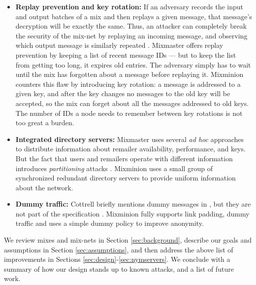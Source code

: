 \documentclass[final,inpress,inline]{ieee}
\begin{document}
\begin{itemize}
\item \textbf{Replay prevention and key rotation:} 
If an adversary records the input and output batches of a mix and then
replays a given message, that message's decryption will be exactly the
same. Thus, an attacker can completely break the security of the mix-net by
replaying an incoming message, and observing which output message is 
similarly repeated
\cite{chaum-mix}. Mixmaster offers replay prevention by
keeping a list of recent message IDs --- but to keep the list from
getting too long, it expires old entries. The adversary simply has to
wait until the mix has forgotten about a
message before replaying it. Mixminion counters this flaw by introducing
key rotation: a message is addressed to a given key, and after the key
changes no messages to the old key will be accepted, so the mix can forget
about all the messages addressed to old keys. The
number of IDs a node needs to remember between key rotations is not
too great a burden.

\item \textbf{Integrated directory servers:} Mixmaster uses several \emph{ad hoc}
approaches to distribute information about remailer availability, performance, and
keys. But the fact that users and remailers operate with
different information introduces \emph{partitioning} attacks
\cite{XXXX}.  Mixminion
uses a small group of synchronized redundant directory servers
to provide uniform information about the network.

\item \textbf{Dummy traffic:} Cottrell briefly mentions dummy messages in
\cite{mixmaster-attacks}, but they are not part of the specification
\cite{mixmaster-spec}. Mixminion fully supports link padding, dummy
traffic and uses a simple dummy policy to
improve anonymity.

\end{itemize}


We review mixes and mix-nets in Section \ref{sec:background},
describe our goals and assumptions in Section \ref{sec:assumptions},
and then address the above list of improvements in Sections
\ref{sec:design}-\ref{sec:nymservers}. 
 We conclude with a summary of
how our design stands up to known attacks, and a list of future work.
\end{document}
